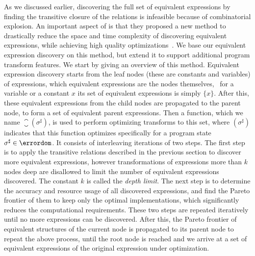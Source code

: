 As we discussed earlier, discovering the full set of equivalent expressions
by finding the transitive closure of the relations is infeasible because of
combinatorial explosion.  An important aspect of \soap{} is that they proposed
a new method to drastically reduce the space and time complexity of discovering
equivalent expressions, while achieving high quality optimizations~\cite{soap}.
We base our equivalent expression discovery on this method, but extend it
to support additional program transform features.  We start by giving an
overview of this method.  Equivalent expression discovery starts from the leaf
nodes (these are constants and variables) of expressions, which equivalent
expressions are the nodes themselves, \ie~for a variable or a constant $x$
its set of equivalent expressions is simply $\{x\}$.  After this, these
equivalent expressions from the child nodes are propagated to the parent
node, to form a set of equivalent parent expressions.  Then a function, which
we name $\closure(\sigma^\sharp)$, is used to perform optimizing transforms
to this set, where $(\sigma^\sharp)$ indicates that this function optimizes
specifically for a program state $\sigma^\sharp \in \errordom$.  It consists
of interleaving iterations of two steps.  The first step is to apply the
transitive relations described in the previous section to discover more
equivalent expressions, however transformations of expressions more than
$k$ nodes deep are disallowed to limit the number of equivalent expressions
discovered.  The constant $k$ is called the \emph{depth limit}.  The next step
is to determine the accuracy and resource usage of all discovered expressions,
and find the Pareto frontier of them to keep only the optimal implementations,
which significantly reduces the computational requirements.  These two steps
are repeated iteratively until no more expressions can be discovered.  After
this, the Pareto frontier of equivalent structures of the current node is
propagated to its parent node to repeat the above process, until the root
node is reached and we arrive at a set of equivalent expressions of the
original expression under optimization.


